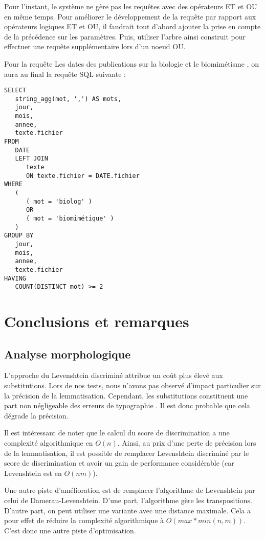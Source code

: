 \documentclass[a4paper]{elsarticle}
\begin{document}
Pour l'instant, le système ne gère pas les requêtes avec des opérateurs ET et OU en même temps.
Pour améliorer le développement de la requête par rapport aux opérateurs logiques ET et OU, il faudrait tout d'abord ajouter la prise en compte de la précédence sur les paramètres. Puis, utiliser l'arbre ainsi construit pour effectuer une requête supplémentaire lors d'un noeud OU.

Pour la requête \og Les dates des publications sur la biologie et le biomimétisme \fg{}, on aura au final la requête SQL suivante :

\begin{lstlisting}[style=sql]
SELECT
   string_agg(mot, ',') AS mots,
   jour,
   mois,
   annee,
   texte.fichier 
FROM
   DATE 
   LEFT JOIN
      texte 
      ON texte.fichier = DATE.fichier 
WHERE
   (
      ( mot = 'biolog' ) 
      OR 
      ( mot = 'biomimétique' )
   )
GROUP BY
   jour,
   mois,
   annee,
   texte.fichier 
HAVING
   COUNT(DISTINCT mot) >= 2
\end{lstlisting}

\section{Conclusions et remarques}

\subsection{Analyse morphologique}

L'approche du Levenshtein discriminé attribue un coût plus élevé aux substitutions. Lors de nos tests, nous n'avons pas observé d'impact particulier sur la précision de la lemmatisation. Cependant, les substitutions constituent une part non négligeable des erreurs de typographie \cite{church1991probability}. Il est donc probable que cela dégrade la précision.

Il est intéressant de noter que le calcul du score de discrimination a une complexité algorithmique en $O(n)$. Ainsi, au prix d'une perte de précision lors de la lemmatisation, il est possible de remplacer Levenshtein discriminé par le score de discrimination et avoir un gain de performance considérable (car Levenshtein est en $O(nm)$).

Une autre piste d'amélioration est de remplacer l'algorithme de Levenshtein par celui de Damerau-Levenshtein. D'une part, l'algorithme gère les transpositions. D'autre part, on peut utiliser une variante avec une distance maximale. Cela a pour effet de réduire la complexité algorithmique à $O(max * min(n, m))$. C'est donc une autre piste d'optimisation.
\end{document}

